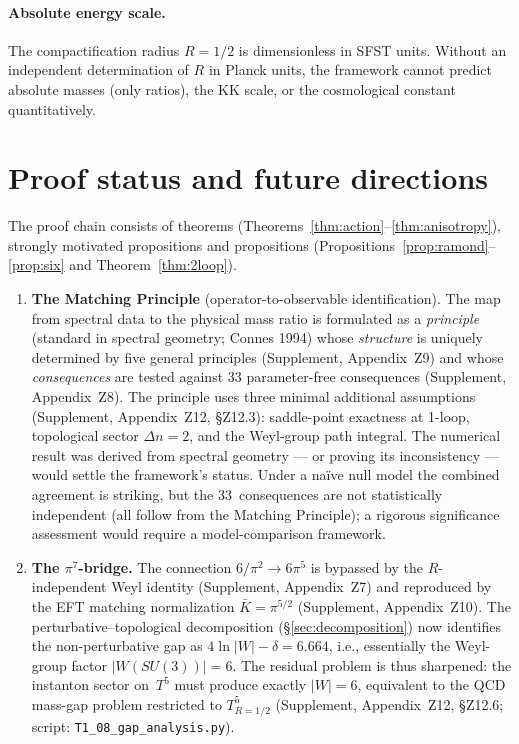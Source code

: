 \documentclass[11pt,a4paper]{article}
\theoremstyle{definition}
\theoremstyle{remark}
\begin{document}
\paragraph{Absolute energy scale.}
The compactification radius $R=1/2$ is dimensionless in SFST units.
Without an independent determination of $R$ in Planck units,
the framework cannot predict absolute masses (only ratios),
the KK scale, or the cosmological constant quantitatively.

\section{Proof status and future directions}
\label{sec:open}

The proof chain consists of theorems (Theorems~\ref{thm:action}--\ref{thm:anisotropy}),
strongly motivated propositions
and propositions (Propositions~\ref{prop:ramond}--\ref{prop:six} and Theorem~\ref{thm:2loop}).

\begin{enumerate}[label=\textbf{O\arabic*.}]
\item \textbf{The Matching Principle} (operator-to-observable identification).
  The map from spectral data to the physical mass ratio is formulated as
  a \emph{principle} (standard in spectral geometry; Connes 1994) whose \emph{structure} is uniquely
  determined by five general principles (Supplement, Appendix~Z9) and
  whose \emph{consequences} are tested against 33 parameter-free consequences
  (Supplement, Appendix~Z8).  The principle uses three minimal
  additional assumptions (Supplement, Appendix~Z12, \S Z12.3): saddle-point
  exactness at 1-loop, topological sector $\Delta n=2$, and the Weyl-group
  path integral.  The numerical result was derived from spectral geometry ---
  or proving its inconsistency --- would settle the framework's status.
  Under a na\"ive null model the combined agreement is striking,
  but the 33~consequences are not statistically independent (all
  follow from the Matching Principle); a rigorous significance assessment would
  require a model-comparison framework.

\item \textbf{The $\pi^7$-bridge.}  The connection $6/\pi^2\to 6\pi^5$
  is bypassed by the $R$-independent Weyl identity (Supplement,
  Appendix~Z7) and reproduced by the EFT matching normalization
  $\bar K=\pi^{5/2}$ (Supplement, Appendix~Z10).  The perturbative--topological
  decomposition (\S\ref{sec:decomposition}) now identifies the non-perturbative
  gap as $4\ln|W|-\delta=6.664$, i.e., essentially the Weyl-group factor
  $|W(SU(3))|=6$.  The residual problem is thus sharpened:
  the instanton sector on~$T^5$ must produce exactly $|W|=6$,
  equivalent to the QCD mass-gap problem restricted to $T^5_{R=1/2}$
  (Supplement, Appendix~Z12, \S Z12.6; script: \texttt{T1\_08\_gap\_analysis.py}).
\end{enumerate}
\end{document}
